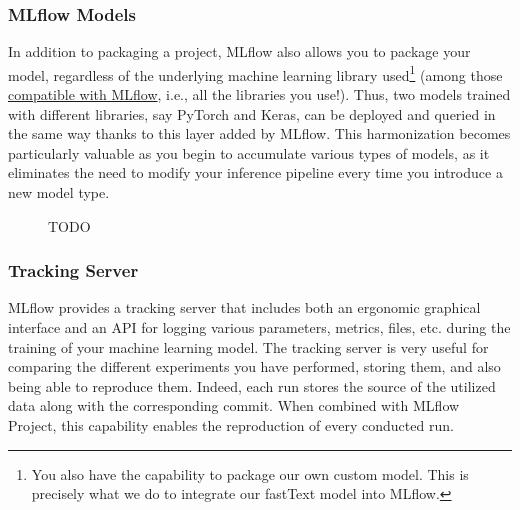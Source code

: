 

\subsubsection{MLflow Models}

In addition to packaging a project, MLflow also allows you to package your model, regardless of the underlying machine learning library used\footnote{You also have the capability to package our own custom model. This is precisely what we do to integrate our fastText model into MLflow.}  (among those \href{https://MLflow.org/docs/latest/models.html#built-in-model-flavors}{compatible with MLflow}, i.e., all the libraries you use!). Thus, two models trained with different libraries, say PyTorch and Keras, can be deployed and queried in the same way thanks to this layer added by MLflow. This harmonization becomes particularly valuable as you begin to accumulate various types of models, as it eliminates the need to modify your inference pipeline every time you introduce a new model type.

\begin{figure}[htbp]
    \centering
    \caption{TODO}
    \label{fig:mlflow-models}
\end{figure}

\subsubsection{Tracking Server}

MLflow provides a tracking server that includes both an ergonomic graphical interface and an API for logging various parameters, metrics, files, etc. during the training of your machine learning model. The tracking server is very useful for comparing the different experiments you have performed, storing them, and also being able to reproduce them. Indeed, each run stores the source of the utilized data along with the corresponding commit. When combined with MLflow Project, this capability enables the reproduction of every conducted run.

